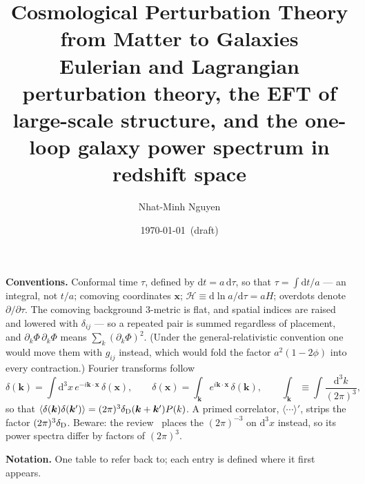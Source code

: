 \documentclass[a4paper,11pt]{article}
\title{Cosmological Perturbation Theory from Matter to Galaxies\\[2mm]
\large Eulerian and Lagrangian perturbation theory, the EFT of large-scale
structure, and the one-loop galaxy power spectrum in redshift space}
\author{Nhat-Minh Nguyen}
\date{\today\ (draft)}
\newcommand{\vx}{\bm{x}}
\newcommand{\vk}{\bm{k}}
\def\cH{\mathcal{H}}
\newcommand{\dd}{\mathrm{d}}
\def\dirac{\delta_{\rm D}}
\numberwithin{equation}{section}
\begin{document}
\maketitle

\noindent\textbf{Conventions.} Conformal time $\tau$, defined by $\dd t = a\,\dd\tau$, so that $\tau = \int\dd t/a$ --- an integral, not $t/a$; comoving coordinates $\vx$; $\cH \equiv \dd\ln a/\dd\tau = aH$; overdots denote $\partial/\partial\tau$. The comoving background 3-metric is flat, and spatial indices are raised and lowered with $\delta_{ij}$ --- so a repeated pair is summed regardless of placement, and $\partial_k\Phi\,\partial_k\Phi$ means $\sum_k(\partial_k\Phi)^2$. (Under the general-relativistic convention one would move them with $g_{ij}$ instead, which would fold the factor $a^2(1-2\phi)$ into every contraction.) Fourier transforms follow
\begin{equation*}
\delta(\vk) = \int \dd^3x\, e^{-i\vk\cdot\vx}\,\delta(\vx),
\qquad
\delta(\vx) = \int_{\vk} e^{i\vk\cdot\vx}\,\delta(\vk),
\qquad
\int_{\vk} \equiv \int\!\frac{\dd^3k}{(2\pi)^3},
\end{equation*}
so that $\langle\delta(\vk)\delta(\vk')\rangle = (2\pi)^3\dirac(\vk+\vk')P(k)$. A primed correlator, $\langle\cdots\rangle'$, strips the factor $(2\pi)^3\dirac$. Beware: the review~\cite{Bernardeau2002} places the $(2\pi)^{-3}$ on $\dd^3x$ instead, so its power spectra differ by factors of $(2\pi)^3$.

\medskip
\noindent\textbf{Notation.} One table to refer back to; each entry is defined where it first appears.
\end{document}
